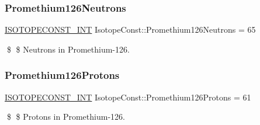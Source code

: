 \subsubsection{\texorpdfstring{Promethium126\+Neutrons}{Promethium126Neutrons}}
{\footnotesize\ttfamily \mbox{\hyperlink{group___isotope_const-_macros_ga5f18360b3e99483a35c32d789e62621c}{I\+S\+O\+T\+O\+P\+E\+C\+O\+N\+S\+T\+\_\+\+I\+NT}} Isotope\+Const\+::\+Promethium126\+Neutrons = 65}

\$ \$ Neutrons in Promethium-\/126. \mbox{\label{group___isotope_const-_promethium-_pm126_ga9967f8c4656071b390a85f4923e2c6b7}} 
\subsubsection{\texorpdfstring{Promethium126\+Protons}{Promethium126Protons}}
{\footnotesize\ttfamily \mbox{\hyperlink{group___isotope_const-_macros_ga5f18360b3e99483a35c32d789e62621c}{I\+S\+O\+T\+O\+P\+E\+C\+O\+N\+S\+T\+\_\+\+I\+NT}} Isotope\+Const\+::\+Promethium126\+Protons = 61}

\$ \$ Protons in Promethium-\/126. 